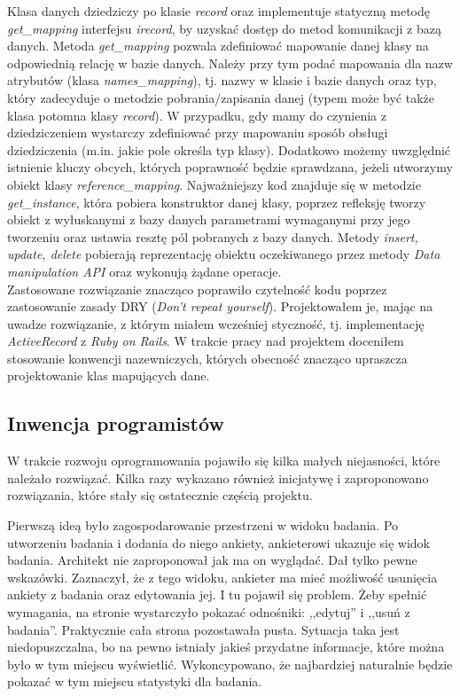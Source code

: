 Klasa danych dziedziczy po klasie \emph{record} oraz implementuje statyczną metodę \emph{get\_mapping} interfejsu \emph{irecord}, by uzyskać dostęp do metod komunikacji z bazą danych. Metoda \emph{get\_mapping} pozwala zdefiniować mapowanie danej klasy na odpowiednią relację w bazie danych. Należy przy tym podać mapowania dla nazw atrybutów (klasa \emph{names\_mapping}), tj. nazwy w klasie i bazie danych oraz typ, który zadecyduje o metodzie pobrania/zapisania danej (typem może być także klasa potomna klasy \emph{record}). W przypadku, gdy mamy do czynienia z dziedziczeniem wystarczy zdefiniować przy mapowaniu sposób obsługi dziedziczenia (m.in. jakie pole określa typ klasy). Dodatkowo możemy uwzględnić istnienie kluczy obcych, których poprawność będzie sprawdzana, jeżeli utworzymy obiekt klasy \emph{reference\_mapping}. Najważniejszy kod znajduje się w metodzie \emph{get\_instance}, która pobiera konstruktor danej klasy, poprzez refleksję tworzy obiekt z wyłuskanymi z bazy danych parametrami wymaganymi przy jego tworzeniu oraz ustawia resztę pól pobranych z bazy danych. Metody \emph{insert, update, delete} pobierają reprezentację obiektu oczekiwanego przez metody \emph{Data manipulation API} oraz wykonują żądane operacje.\\
Zastosowane rozwiązanie znacząco poprawiło czytelność kodu poprzez zastosowanie zasady DRY (\emph{Don't repeat yourself}). Projektowałem je, mając na uwadze rozwiązanie, z którym miałem wcześniej styczność, tj. implementację \emph{ActiveRecord} z \emph{Ruby on Rails}. W trakcie pracy nad projektem doceniłem stosowanie konwencji nazewniczych, których obecność znacząco upraszcza projektowanie klas mapujących dane.

\subsection{Inwencja programistów}
\label{Chapter62d}

W trakcie rozwoju oprogramowania pojawiło się kilka małych niejasności, które należało rozwiązać. Kilka razy wykazano również inicjatywę i zaproponowano rozwiązania, które stały się ostatecznie częścią projektu.

Pierwszą ideą było zagospodarowanie przestrzeni w widoku badania. Po utworzeniu badania i dodania do niego ankiety, ankieterowi ukazuje się widok badania. Architekt nie zaproponował jak ma on wyglądać. Dał tylko pewne wskazówki. Zaznaczył, że z tego widoku, ankieter ma mieć możliwość usunięcia ankiety z badania oraz edytowania jej. I tu pojawił się problem. Żeby spełnić wymagania, na stronie wystarczyło pokazać odnośniki: ,,edytuj'' i ,,usuń z badania''. Praktycznie cała strona pozostawała pusta. Sytuacja taka jest niedopuszczalna, bo na pewno istniały jakieś przydatne informacje, które można było w tym miejscu wyświetlić. Wykoncypowano, że najbardziej naturalnie będzie pokazać w tym miejscu statystyki dla badania.

